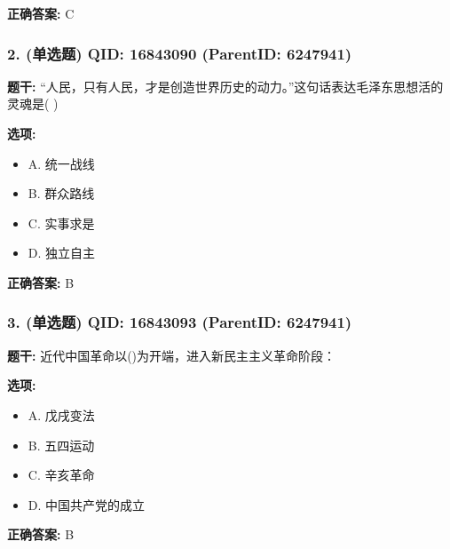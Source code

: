 \documentclass[12pt,UTF8]{ctexart}
\begin{document}
\textbf{正确答案:}
C

\vspace{0.3em}\hrulefill\vspace{0.7em}

\subsubsection*{2. (单选题) \small QID: 16843090 (ParentID: 6247941)}

\textbf{题干:}
“人民，只有人民，才是创造世界历史的动力。”这句话表达毛泽东思想活的灵魂是( )



\textbf{选项:}
\begin{itemize}[leftmargin=*]

  \item A. 统一战线

  \item B. 群众路线

  \item C. 实事求是

  \item D. 独立自主

\end{itemize}

\textbf{正确答案:}
B

\vspace{0.3em}\hrulefill\vspace{0.7em}

\subsubsection*{3. (单选题) \small QID: 16843093 (ParentID: 6247941)}

\textbf{题干:}
近代中国革命以()为开端，进入新民主主义革命阶段：



\textbf{选项:}
\begin{itemize}[leftmargin=*]

  \item A. 戊戌变法

  \item B. 五四运动

  \item C. 辛亥革命

  \item D. 中国共产党的成立

\end{itemize}

\textbf{正确答案:}
B
\end{document}

